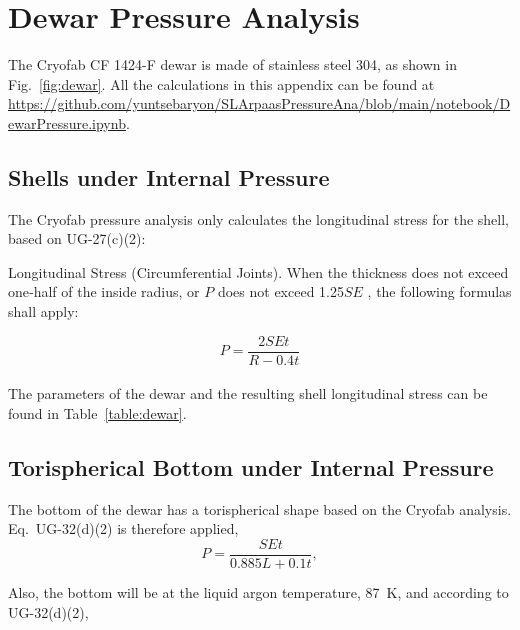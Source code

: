 \section{Dewar Pressure Analysis}
\label{app:dewar}

The Cryofab CF 1424-F dewar is made of stainless steel 304,
as shown in Fig.~\ref{fig:dewar}.
All the calculations in this appendix can be found at
\url{https://github.com/yuntsebaryon/SLArpaasPressureAna/blob/main/notebook/DewarPressure.ipynb}.

\subsection{Shells under Internal Pressure}
\label{app:shell}

The Cryofab pressure analysis only calculates the longitudinal 
stress for the shell, based on UG-27(c)(2):

\begin{displayquote}
    Longitudinal Stress (Circumferential Joints). When the thickness does not exceed 
    one‐half of the inside radius, or $P$ does not exceed 1.25$SE$ , 
    the following formulas shall apply:\\
\end{displayquote}

\begin{equation}
    P = \frac{2SEt}{R-0.4t}
\end{equation}
\\

The parameters of the dewar and the resulting shell longitudinal stress
can be found in Table~\ref{table:dewar}.



\subsection{Torispherical Bottom under Internal Pressure}
\label{app:bottom}

The bottom of the dewar has a torispherical shape based on the Cryofab
analysis.
Eq.~UG-32(d)(2) is therefore applied,
\begin{equation}
    P = \frac{SEt}{0.885L+0.1t},
\label{eq:UG-32_d_2}
\end{equation}

Also, the bottom will be at the liquid argon temperature, 87~K,
and according to UG-32(d)(2),

